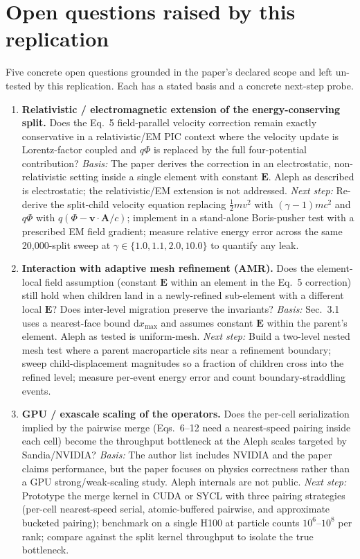 \section{Open questions raised by this replication}

Five concrete open questions grounded in the paper's declared scope and left un-tested by this replication. Each has a stated basis and a concrete next-step probe.

\begin{enumerate}
  \item \textbf{Relativistic / electromagnetic extension of the energy-conserving split.}
  Does the Eq.~5 field-parallel velocity correction remain exactly conservative in a relativistic/EM PIC context where the velocity update is Lorentz-factor coupled and $q\Phi$ is replaced by the full four-potential contribution?
  \emph{Basis:} The paper derives the correction in an electrostatic, non-relativistic setting inside a single element with constant $\mathbf{E}$. Aleph as described is electrostatic; the relativistic/EM extension is not addressed.
  \emph{Next step:} Re-derive the split-child velocity equation replacing $\tfrac{1}{2}mv^2$ with $(\gamma-1)mc^2$ and $q\Phi$ with $q(\Phi - \mathbf{v}\cdot\mathbf{A}/c)$; implement in a stand-alone Boris-pusher test with a prescribed EM field gradient; measure relative energy error across the same 20{,}000-split sweep at $\gamma\in\{1.0, 1.1, 2.0, 10.0\}$ to quantify any leak.

  \item \textbf{Interaction with adaptive mesh refinement (AMR).}
  Does the element-local field assumption (constant $\mathbf{E}$ within an element in the Eq.~5 correction) still hold when children land in a newly-refined sub-element with a different local $\mathbf{E}$? Does inter-level migration preserve the invariants?
  \emph{Basis:} Sec.~3.1 uses a nearest-face bound $\mathrm{d}x_{\max}$ and assumes constant $\mathbf{E}$ within the parent's element. Aleph as tested is uniform-mesh.
  \emph{Next step:} Build a two-level nested mesh test where a parent macroparticle sits near a refinement boundary; sweep child-displacement magnitudes so a fraction of children cross into the refined level; measure per-event energy error and count boundary-straddling events.

  \item \textbf{GPU / exascale scaling of the operators.}
  Does the per-cell serialization implied by the pairwise merge (Eqs.~6--12 need a nearest-speed pairing inside each cell) become the throughput bottleneck at the Aleph scales targeted by Sandia/NVIDIA?
  \emph{Basis:} The author list includes NVIDIA and the paper claims performance, but the paper focuses on physics correctness rather than a GPU strong/weak-scaling study. Aleph internals are not public.
  \emph{Next step:} Prototype the merge kernel in CUDA or SYCL with three pairing strategies (per-cell nearest-speed serial, atomic-buffered pairwise, and approximate bucketed pairing); benchmark on a single H100 at particle counts $10^6$--$10^8$ per rank; compare against the split kernel throughput to isolate the true bottleneck.


\end{enumerate}
